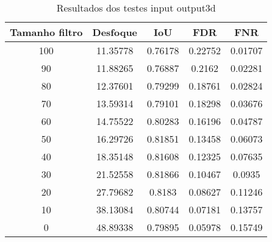 \begin{table}[h]
    \centering
    \caption{Resultados dos testes input output3d}
    \label{tab:blur_solution_input_output_3d}
    \begin{tabular}{|c|c|c|c|c|}
        \hline
        Tamanho filtro & Desfoque & IoU & FDR & FNR \\
        \hline
        100 & 11.35778 & 0.76178 & 0.22752 & 0.01707\\
        90 & 11.88265 & 0.76887 & 0.2162 & 0.02281\\
        80 & 12.37601 & 0.79299 & 0.18761 & 0.02824\\
        70 & 13.59314 & 0.79101 & 0.18298 & 0.03676\\
        60 & 14.75522 & 0.80283 & 0.16196 & 0.04787\\
        50 & 16.29726 & 0.81851 & 0.13458 & 0.06073\\
        40 & 18.35148 & 0.81608 & 0.12325 & 0.07635\\
        30 & 21.52558 & 0.81866 & 0.10467 & 0.0935\\
        20 & 27.79682 & 0.8183 & 0.08627 & 0.11246\\
        10 & 38.13084 & 0.80744 & 0.07181 & 0.13757\\
        0 & 48.89338 & 0.79895 & 0.05978 & 0.15749\\
        \hline
    \end{tabular}
\end{table}


